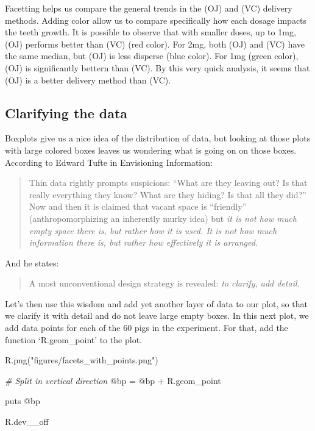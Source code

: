 \documentclass[11pt,]{article}
\newenvironment{Shaded}{\begin{snugshade}}{\end{snugshade}}
\newcommand{\StringTok}[1]{\textcolor[rgb]{0.31,0.60,0.02}{#1}}
\newcommand{\CommentTok}[1]{\textcolor[rgb]{0.56,0.35,0.01}{\textit{#1}}}
\newcommand{\OtherTok}[1]{\textcolor[rgb]{0.56,0.35,0.01}{#1}}
\newcommand{\NormalTok}[1]{#1}
\begin{document}
Facetting helps us compare the general trends in the (OJ) and (VC)
delivery methods. Adding color allow us to compare specifically how each
dosage impacts the teeth growth. It is possible to observe that with
smaller doses, up to 1mg, (OJ) performs better than (VC) (red color).
For 2mg, both (OJ) and (VC) have the same median, but (OJ) is less
disperse (blue color). For 1mg (green color), (OJ) is significantly
bettern than (VC). By this very quick analysis, it seems that (OJ) is a
better delivery method than (VC).

\subsection{Clarifying the data}\label{clarifying-the-data}

Boxplots give us a nice idea of the distribution of data, but looking at
those plots with large colored boxes leaves us wondering what is going
on on those boxes. According to Edward Tufte in Envisioning Information:

\begin{quote}
Thin data rightly prompts suspicions: ``What are they leaving out? Is
that really everything they know? What are they hiding? Is that all they
did?'' Now and then it is claimed that vacant space is ``friendly''
(anthropomorphizing an inherently murky idea) but \emph{it is not how
much empty space there is, but rather how it is used. It is not how much
information there is, but rather how effectively it is arranged.}
\end{quote}

And he states:

\begin{quote}
A most unconventional design strategy is revealed: \emph{to clarify, add
detail.}
\end{quote}

Let's then use this wisdom and add yet another layer of data to our
plot, so that we clarify it with detail and do not leave large empty
boxes. In this next plot, we add data points for each of the 60 pigs in
the experiment. For that, add the function `R.geom\_point' to the plot.

\begin{Shaded}
\begin{Highlighting}[]
\NormalTok{R.png(}\StringTok{"figures/facets_with_points.png"}\NormalTok{)}

\CommentTok{# Split in vertical direction}
\OtherTok{@bp}\NormalTok{ = }\OtherTok{@bp}\NormalTok{ + R.geom_point}

\NormalTok{puts }\OtherTok{@bp}

\NormalTok{R.dev__off}
\end{Highlighting}
\end{Shaded}
\end{document}
